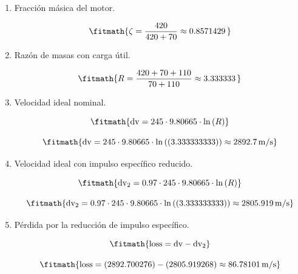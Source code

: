 \begin{enumerate}

\item Fracción másica del motor.

\[\fitmath{\zeta=\frac{420}{420+70}\approx 0.8571429\,}\]

\item Razón de masas con carga útil.

\[\fitmath{R=\frac{420+70+110}{70+110}\approx 3.333333\,}\]

\item Velocidad ideal nominal.

\[\fitmath{\mathrm{dv}=245\cdot 9.80665\cdot \ln\left(R\right)}\]

\[\fitmath{\mathrm{dv}=245\cdot 9.80665\cdot \ln\left((3.333333333)\right)\approx 2892.7\,\mathrm{m/s}}\]

\item Velocidad ideal con impulso específico reducido.

\[\fitmath{\mathrm{dv}_{2}=0.97\cdot 245\cdot 9.80665\cdot \ln\left(R\right)}\]

\[\fitmath{\mathrm{dv}_{2}=0.97\cdot 245\cdot 9.80665\cdot \ln\left((3.333333333)\right)\approx 2805.919\,\mathrm{m/s}}\]

\item Pérdida por la reducción de impulso específico.

\[\fitmath{\mathrm{loss}=\mathrm{dv}-\mathrm{dv}_{2}}\]

\[\fitmath{\mathrm{loss}=(2892.700276)-(2805.919268)\approx 86.78101\,\mathrm{m/s}}\]

\end{enumerate}
